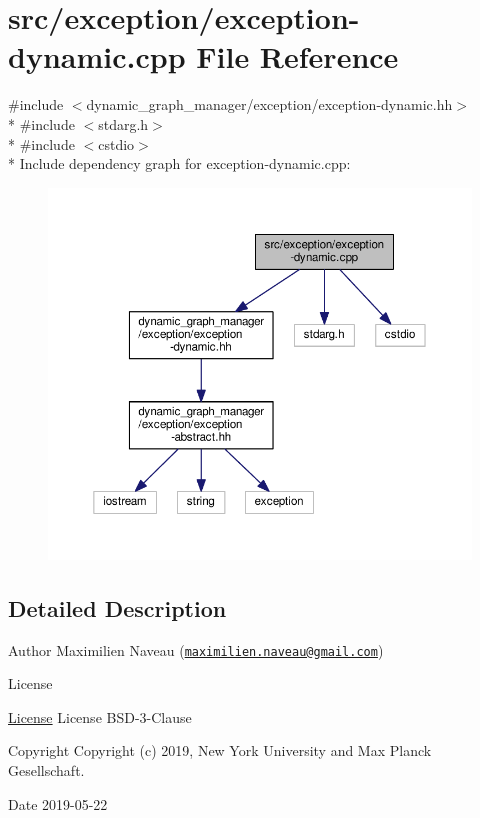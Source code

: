 \hypertarget{exception-dynamic_8cpp}{}\section{src/exception/exception-\/dynamic.cpp File Reference}
\label{exception-dynamic_8cpp}
{\ttfamily \#include $<$dynamic\+\_\+graph\+\_\+manager/exception/exception-\/dynamic.\+hh$>$}\\*
{\ttfamily \#include $<$stdarg.\+h$>$}\\*
{\ttfamily \#include $<$cstdio$>$}\\*
Include dependency graph for exception-\/dynamic.cpp\+:
\nopagebreak
\begin{figure}[H]
\begin{center}
\leavevmode
\includegraphics[width=350pt]{exception-dynamic_8cpp__incl}
\end{center}
\end{figure}


\subsection{Detailed Description}
\begin{DoxyAuthor}{Author}
Maximilien Naveau (\href{mailto:maximilien.naveau@gmail.com}{\tt maximilien.\+naveau@gmail.\+com}) 
\end{DoxyAuthor}
\begin{DoxyRefDesc}{License}
\item[\hyperlink{license__license000047}{License}]License B\+S\+D-\/3-\/\+Clause \end{DoxyRefDesc}
\begin{DoxyCopyright}{Copyright}
Copyright (c) 2019, New York University and Max Planck Gesellschaft. 
\end{DoxyCopyright}
\begin{DoxyDate}{Date}
2019-\/05-\/22 
\end{DoxyDate}
